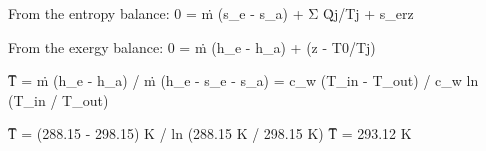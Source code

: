 From the entropy balance:  
0 = ṁ (s_e - s_a) + Σ Q̇j/Tj + s_erz  

From the exergy balance:  
0 = ṁ (h_e - h_a) + (z - T0/Tj)  

T̅ = ṁ (h_e - h_a) / ṁ (h_e - s_e - s_a) = c_w (T_in - T_out) / c_w ln (T_in / T_out)  

T̅ = (288.15 - 298.15) K / ln (288.15 K / 298.15 K)  
T̅ = 293.12 K